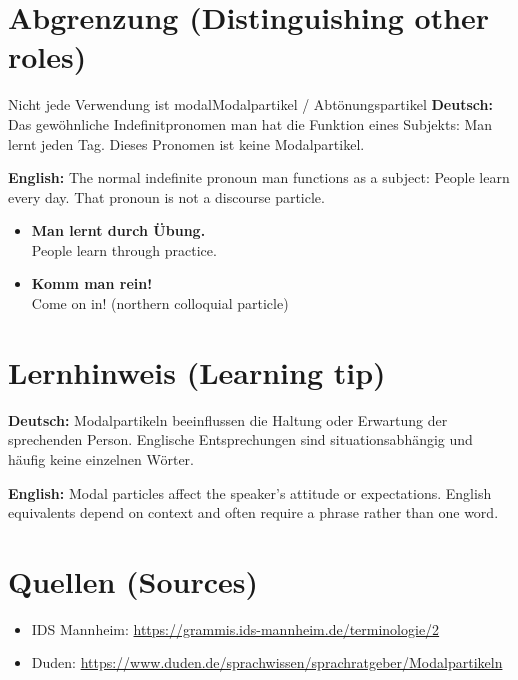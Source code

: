 \documentclass[a4paper,11pt]{article}
\newcommand{\GermanText}[1]{\textbf{Deutsch: }#1\par}
\newcommand{\EnglishText}[1]{{\small\color{SoftGray}\textbf{English: }#1\par}}
\newcommand{\ExampleItem}[2]{\item \textbf{#1}\\{\small\color{SoftGray}#2}}
\begin{document}
\section{Abgrenzung \textnormal{(Distinguishing other roles)}}
\begin{grammarentry}{Nicht jede Verwendung ist modal}{Modalpartikel / Abtönungspartikel}
\GermanText{Das gewöhnliche Indefinitpronomen man hat die Funktion eines Subjekts: Man lernt jeden Tag. Dieses Pronomen ist keine Modalpartikel.}
\EnglishText{The normal indefinite pronoun man functions as a subject: People learn every day. That pronoun is not a discourse particle.}
\end{grammarentry}
\begin{exbox}\begin{itemize}
\ExampleItem{Man lernt durch Übung.}{People learn through practice.}
\ExampleItem{Komm man rein!}{Come on in! (northern colloquial particle)}
\end{itemize}\end{exbox}
\section{Lernhinweis \textnormal{(Learning tip)}}
\GermanText{Modalpartikeln beeinflussen die Haltung oder Erwartung der sprechenden Person. Englische Entsprechungen sind situationsabhängig und häufig keine einzelnen Wörter.}
\EnglishText{Modal particles affect the speaker's attitude or expectations. English equivalents depend on context and often require a phrase rather than one word.}
\section{Quellen \textnormal{(Sources)}}
\begin{itemize}
\item IDS Mannheim: \url{https://grammis.ids-mannheim.de/terminologie/2}
\item Duden: \url{https://www.duden.de/sprachwissen/sprachratgeber/Modalpartikeln}
\end{itemize}
\end{document}
